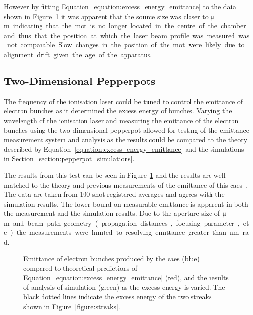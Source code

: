 However by fitting Equation~\ref{equation:excess_energy_emittance} to the data shown in Figure~\ref{figure:emittance_vs_theory} it was apparent that the source size was closer to \unit[340]{$\muup$m} indicating that the \gls{mot} is no longer located in the centre of the chamber and thus that the position at which the laser beam profile was measured was not comparable.
Slow changes in the position of the \gls{mot} were likely due to alignment drift given the age of the apparatus.

\subsection{Two-Dimensional Pepperpots}
The frequency of the ionisation laser could be tuned to control the emittance of electron bunches as it determined the excess energy of bunches.
Varying the wavelength of the ionisation laser and measuring the emittance of the electron bunches using the two dimensional pepperpot allowed for testing of the emittance measurement system and analysis as the results could be compared to the theory described by Equation~\ref{equation:excess_energy_emittance} and the simulations in Section~\ref{section:pepperpot_simulations}.

The results from this test can be seen in Figure~\ref{figure:emittance_vs_theory} and the results are well matched to the theory and previous measurements of the emittance of this \gls{caes}~\cite{mcculloch_high-coherence_2013}.
The data are taken from 100-shot registered averages and agrees with the simulation results.
The lower bound on measurable emittance is apparent in both the measurement and the simulation results.
Due to the aperture size of \unit[50]{$\muup$m} and beam path geometry (propagation distances, focusing parameter, etc.) the measurements were limited to resolving emittance greater than \unit[41]{nm rad}.

\begin{figure}
    \center
    
    \caption[Measured emittance compared with theory and simulation.]{Emittance of electron bunches produced by the \gls{caes} (blue) compared to theoretical predictions of Equation~\ref{equation:excess_energy_emittance} (red), and the results of analysis of simulation (green) as the excess energy is varied. The black dotted lines indicate the excess energy of the two streaks shown in Figure~\ref{figure:streaks}.}
    \label{figure:emittance_vs_theory}
\end{figure}


